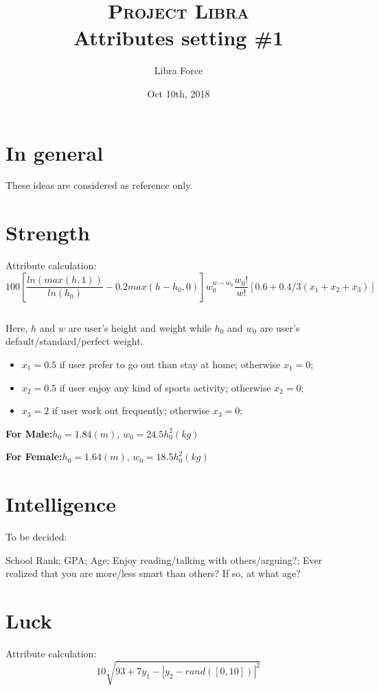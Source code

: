 \documentclass[paper=letter, fontsize=12pt]{scrartcl} %
\title{
\normalfont \normalsize
\textsc{Project Libra} \\ [14pt] 
\huge Attributes setting \#1   \\ 
}
\author{Libra Force} %
\date{Oct 10th, 2018} %
\numberwithin{equation}{section} %
\numberwithin{figure}{section} %
\numberwithin{table}{section} %
\begin{document}
\maketitle %

\section{In general}
These ideas are considered as reference only.

\section{Strength}
Attribute calculation:
\begin{equation}
100[\frac{ln(max(h,1))}{ln(h_0)}-0.2max(h-h_0,0)]w_0^{w-w_0}\frac{w_0!}{w!}[0.6+0.4/3(x_1+x_2+x_3)]
\end{equation}

$$$$

Here, $h$ and $w$ are user's height and weight while $h_0$ and $w_0$ are user's default/standard/perfect weight. 

\begin{itemize}
	\item $x_1=0.5$ if user prefer to go out than stay at home; otherwise $x_1=0$;
	\item $x_2=0.5$ if user enjoy any kind of sports activity; otherwise $x_2=0$;
	\item $x_3=2$ if user work out frequently; otherwise $x_3=0$;
\end{itemize}

\textbf{For Male:}$h_0=1.84(m)$, $w_0=24.5h_0^2(kg)$

\textbf{For Female:}$h_0=1.64(m)$, $w_0=18.5h_0^2(kg)$

\section{Intelligence}
To be decided:

School Rank; GPA; Age; Enjoy reading/talking with others/arguing?; Ever realized that you are more/less smart than others? If so, at what age?

\section{Luck}
Attribute calculation:
\begin{equation}
10\sqrt{93+7y_1-|y_2-rand([0,10])|^2}
\end{equation}
\end{document}
